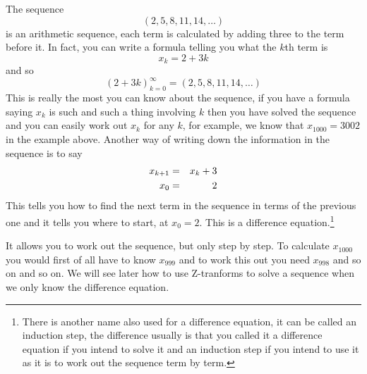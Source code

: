 \documentclass{scrreprt}
\theoremstyle{plain}
\theoremstyle{definition}
\theoremstyle{remark}
\begin{document}
The sequence
\begin{equation}
(2,5,8,11,14,\ldots)
\end{equation}
is an arithmetic sequence, each term is calculated by adding three to the term before it. In fact, you can write a formula telling you what the $k$th term is
\begin{equation}
x_k=2+3k
\end{equation}
and so
\begin{equation}
(2+3k)_{k=0}^\infty=(2,5,8,11,14,\ldots)
\end{equation}
This is really the most you can know about the sequence, if you have a
formula saying $x_k$ is such and such a thing involving $k$ then you
have solved the sequence and you can easily work out $x_k$ for any
$k$, for example, we know that $x_{1000}=3002$ in the example
above. Another way of writing down the information in the sequence is to say
\begin{eqnarray}
x_{k+1}&=&x_{k}+3\cr
x_0&=&2
\end{eqnarray}
This tells you how to find the next term in the sequence in terms of
the previous one and it tells you where to start, at $x_0=2$. This is
a difference equation.\footnote{There is another name also used for a
	difference equation, it can be called an induction step, the
	difference usually is that you called it a difference equation if you
	intend to solve it and an induction step if you intend to use it as it
	is to work out the sequence term by term.}  

It allows you to work out
the sequence, but only step by step. To calculate $x_{1000}$ you would
first of all have to know $x_{999}$ and to work this out you need
$x_{998}$ and so on and so on. We will see later how to use Z-tranforms to solve a sequence when we only know the difference equation.
\end{document}
